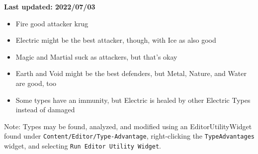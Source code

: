 

\textbf{\color{red}Last updated: 2022/07/03}

\begin{tldr}
	\begin{itemize}
		\item{Fire good attacker krug}
		\item{Electric might be the best attacker, though, with Ice as also good}
		\item{Magic and Martial suck as attackers, but that's okay}
		\item{Earth and Void might be the best defenders, but Metal, Nature, and Water are good, too}
		\item{Some types have an immunity, but Electric is healed by other Electric Types instead of damaged}
	\end{itemize}
	Note: Types may be found, analyzed, and modified using an EditorUtilityWidget found under \texttt{Content/Editor/Type-Advantage}, right-clicking the \texttt{TypeAdvantages} widget, and selecting \texttt{Run Editor Utility Widget}.
\end{tldr}

\newpage


